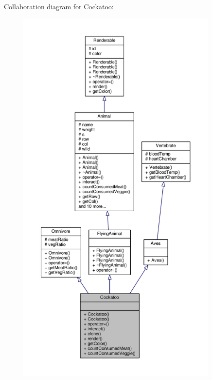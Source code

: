 Collaboration diagram for Cockatoo\+:
\nopagebreak
\begin{figure}[H]
\begin{center}
\leavevmode
\includegraphics[height=550pt]{classCockatoo__coll__graph}
\end{center}
\end{figure}
